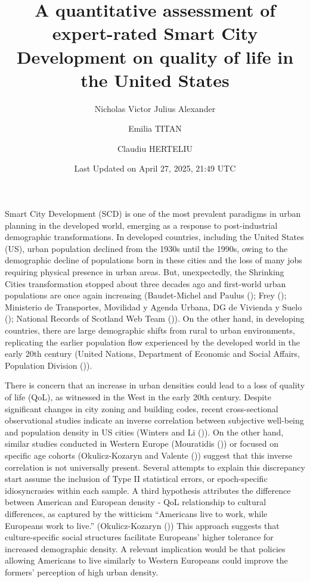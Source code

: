 \documentclass[
  english,
  12pt,
  a4paper,
]{scrartcl}
\title{A quantitative assessment of expert-rated Smart City Development
on quality of life in the United States}
\author[1]{Nicholas Victor Julius Alexander}
\author[1]{Emilia TITAN}
\author[1]{Claudiu HERTELIU}
\affil[1]{Department of Statistics and Econometrics, Bucharest
University for Economic Studies}
\date{Last Updated on April 27, 2025, 21:49 UTC}
\begin{document}
\maketitle


Smart City Development (SCD) is one of the most prevalent paradigms in
urban planning in the developed world, emerging as a response to
post-industrial demographic transformations. In developed countries,
including the United States (US), urban population declined from the
1930s until the 1990s, owing to the demographic decline of populations
born in these cities and the loss of many jobs requiring physical
presence in urban areas. But, unexpectedly, the Shrinking Cities
transformation stopped about three decades ago and first-world urban
populations are once again increasing (Baudet-Michel and Paulus
();
Frey (); Ministerio de
Transportes, Movilidad y Agenda Urbana, DG de Vivienda y Suelo
();
National Records of Scotland Web Team
()).
On the other hand, in developing countries, there are large demographic
shifts from rural to urban environments, replicating the earlier
population flow experienced by the developed world in the early 20th
century (United Nations, Department of Economic and Social Affairs,
Population Division
()).

There is concern that an increase in urban densities could lead to a
loss of quality of life (QoL), as witnessed in the West in the early
20th century. Despite significant changes in city zoning and building
codes, recent cross-sectional observational studies indicate an inverse
correlation between subjective well-being and population density in US
cities (Winters and Li
()). On the
other hand, similar studies conducted in Western Europe (Mouratidis
()) or focused on
specific age cohorts (Okulicz-Kozaryn and Valente
()) suggest that
this inverse correlation is not universally present. Several attempts to
explain this discrepancy start assume the inclusion of Type II
statistical errors, or epoch-specific idiosyncrasies within each sample.
A third hypothesis attributes the difference between American and
European density - QoL relationship to cultural differences, as captured
by the witticism ``Americans live to work, while Europeans work to
live.'' (Okulicz-Kozaryn
()) This
approach suggests that culture-specific social structures facilitate
Europeans' higher tolerance for increased demographic density. A
relevant implication would be that policies allowing Americans to live
similarly to Western Europeans could improve the formers' perception of
high urban density.
\end{document}
